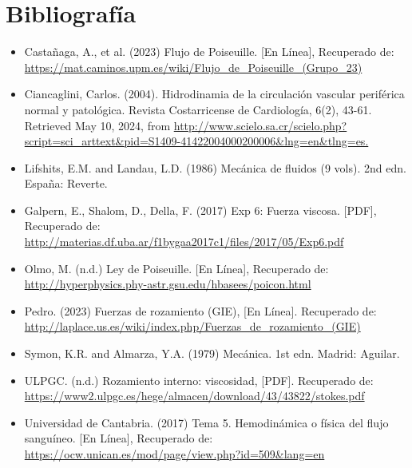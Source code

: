 \documentclass[osajnl,twocolumn,showpacs,superscriptaddress,10pt]{revtex4-2}
\begin{document}
\section{Bibliografía}
    \begin{itemize}
        \item Castañaga, A., et al. (2023) Flujo de Poiseuille. [En Línea], Recuperado de: \url{https://mat.caminos.upm.es/wiki/Flujo_de_Poiseuille_(Grupo_23)}
        \item Ciancaglini, Carlos. (2004). Hidrodinamia de la circulación vascular periférica normal y patológica. Revista Costarricense de Cardiología, 6(2), 43-61. Retrieved May 10, 2024, from \url{http://www.scielo.sa.cr/scielo.php?script=sci_arttext&pid=S1409-41422004000200006&lng=en&tlng=es.}
        \item Lifshits, E.M. and Landau, L.D. (1986) Mecánica de fluidos (9 vols). 2nd edn. España:  Reverte.
        \item Galpern, E., Shalom, D., Della, F. (2017) Exp 6: Fuerza viscosa. [PDF], Recuperado de: \url{http://materias.df.uba.ar/f1bygaa2017c1/files/2017/05/Exp6.pdf}
        \item Olmo, M. (n.d.) Ley de Poiseuille. [En Línea], Recuperado de: \url{http://hyperphysics.phy-astr.gsu.edu/hbasees/poicon.html}
        \item Pedro. (2023) Fuerzas de rozamiento (GIE), [En Línea]. Recuperado de: \url{http://laplace.us.es/wiki/index.php/Fuerzas_de_rozamiento_(GIE)}
        \item Symon, K.R. and Almarza, Y.A. (1979) Mecánica. 1st edn. Madrid: Aguilar.
        \item ULPGC. (n.d.) Rozamiento interno: viscosidad, [PDF]. Recuperado de: \url{https://www2.ulpgc.es/hege/almacen/download/43/43822/stokes.pdf}
        \item Universidad de Cantabria. (2017) Tema 5. Hemodinámica o física del flujo sanguíneo. [En Línea], Recuperado de: \url{https://ocw.unican.es/mod/page/view.php?id=509&lang=en}
    \end{itemize}
\end{document}
